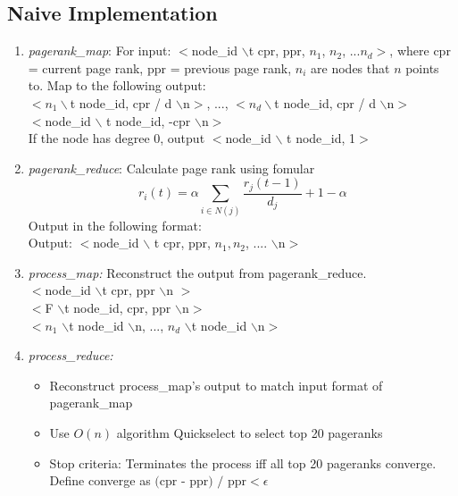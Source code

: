 \documentclass[12pt]{article}
\begin{document}
\subsection{Naive Implementation}
\begin{enumerate}
\item \emph{pagerank\_map}: For input: $<$node\_id $\backslash$t cpr, ppr, $n_1$, $n_2$, ...$n_d >$, where cpr = current page rank, ppr = previous page rank, $n_i$ are nodes that $n$ points to. Map to the following output: \\
$<n_1 \backslash$t node\_id, cpr / d $\backslash$n$>$,  ..., $<n_d \backslash$t node\_id, cpr / d  $\backslash$n$>$ \\
$<$node\_id $\backslash$ t node\_id, -cpr $\backslash$n$>$\\
If the node has degree 0, output $<$node\_id $\backslash$ t node\_id, 1$>$
\item \emph{pagerank\_reduce}:
Calculate page rank using fomular
\[r_i(t) = \alpha\sum_{i \in N(j)} \frac{r_j(t - 1)}{d_j} + 1 - \alpha \]
Output in the following format:\\
Output: $<$node\_id $\backslash$ t cpr, ppr, $n_1, n_2$, .... $\backslash$n$>$
\item \emph{process\_map:} Reconstruct the output from pagerank\_reduce.\\
$<$node\_id $\backslash$t cpr, ppr $\backslash$n $>$ \\
$<$F $\backslash$t node\_id, cpr, ppr $\backslash$n$>$ \\
$<n_1$ $\backslash$t node\_id $\backslash$n, ..., $n_d$ $\backslash$t node\_id $\backslash$n$>$
\item \emph{process\_reduce:} 
\begin{itemize}
\item Reconstruct process\_map's output to match input format of pagerank\_map
\item Use $O(n)$ algorithm Quickselect to select  top 20 pageranks 
\item Stop criteria: Terminates the process iff all top 20 pageranks converge. Define converge as $\text{(cpr - ppr)   /  ppr} < \epsilon$
\end{itemize}
\end{enumerate}
\end{document}
